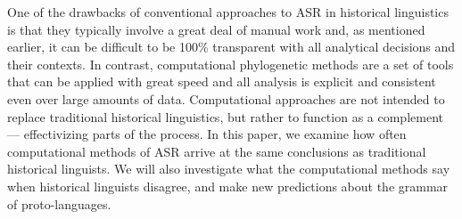 \documentclass[12pt,letterpaper]{article}
\begin{document}
One of the drawbacks of conventional approaches to ASR in historical linguistics is that they typically involve a great deal of manual work and, as mentioned earlier, it can be difficult to be 100\% transparent with all analytical decisions and their contexts. In contrast, computational phylogenetic methods are a set of tools that can be applied with great speed and all analysis is explicit and consistent even over large amounts of data. Computational approaches are not intended to replace traditional historical linguistics, but rather to function as a complement --- effectivizing parts of the process. In this paper, we examine how often computational methods of ASR arrive at the same conclusions as traditional historical linguists. We will also investigate what the computational methods say when historical linguists disagree, and make new predictions about the grammar of proto-languages.


\end{document}
